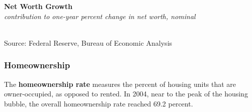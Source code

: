 \documentclass{report}
\makeatletter
\newcommand{\tbllink}[1]{\href{https://raw.githubusercontent.com/bdecon/US-chartbook/master/chartbook/data/#1}{\faTable}}
\newcommand*\short[1]{\expandafter\@gobbletwo\number\numexpr#1\relax}
\newcommand{\sbar}[4]{
		\addplot[ybar stacked, bar width=2.6pt, draw opacity=0, fill=#1] 
			table [x=#2, y=#3, col sep=comma]{#4};}
\newcommand{\dateaxisticks}{
		date coordinates in=x, axis line style={draw=none},
		xmax={2020-05-10},
		max space between ticks=40,	    
		xtick={{1990-01-01}, {1992-01-01}, {1994-01-01}, 
			{1996-01-01}, {1998-01-01}, {2000-01-01}, 
			{2002-01-01}, {2004-01-01}, {2006-01-01},
			{2008-01-01}, {2010-01-01}, {2012-01-01}, {2014-01-01},
		    {2016-01-01}, {2018-01-01}, {2020-01-01}},
		minor xtick={{1989-01-01}, {1991-01-01}, {1993-01-01},
			{1995-01-01}, {1997-01-01}, {1999-01-01}, 
			{2001-01-01}, {2003-01-01}, {2005-01-01}, {2007-01-01},
		    {2009-01-01}, {2011-01-01}, {2013-01-01}, {2015-01-01},
		    {2017-01-01}, {2019-01-01}},
		enlarge y limits={0.06}, enlarge x limits={0.01},
		}
\newcommand{\bbar}[2]{extra #1 ticks = {{#2}}, extra #1 tick labels = ,
		extra #1 tick style = {grid=major, grid style={thick, black!25}},}
\newcommand{\rbars}{
		\fill[color=black!10] (axis cs:{1990-07-01},\pgfkeysvalueof{/pgfplots/ymin}) rectangle 
			(axis cs:{1991-03-01}, \pgfkeysvalueof{/pgfplots/ymax});
		\fill[color=black!10] (axis cs:{2007-12-01},\pgfkeysvalueof{/pgfplots/ymin}) rectangle 
			(axis cs:{2009-07-01}, \pgfkeysvalueof{/pgfplots/ymax});
		\fill[color=black!10] (axis cs:{2001-03-01},\pgfkeysvalueof{/pgfplots/ymin}) rectangle 
			(axis cs:{2001-11-01}, \pgfkeysvalueof{/pgfplots/ymax});}
\makeatother
\begin{document}
{{{{\begin{minipage}{0.76\textwidth}
\vspace{2mm}

\noindent \normalsize \textbf{Net Worth Growth}\\
\footnotesize{\textit{contribution to one-year percent change in net worth, nominal}}\\
\noindent \hspace*{-3mm} \\
\footnotesize{Source: Federal Reserve, Bureau of Economic Analysis} \hfill \tbllink{nw_gr.csv}\\

\vspace{3mm}

\small 


\end{minipage}

\newpage

\begin{minipage}{0.76\textwidth}

\subsubsection*{\color{black!70} \seriffont Homeownership}

\small The \textbf{homeownership rate} measures the percent of housing units that are owner-occupied, as opposed to rented. In 2004, near to the peak of the housing bubble, the overall homeownership rate reached 69.2 percent. 

\end{minipage}

\vspace{1mm}

\begin{minipage}{0.405\textwidth}


\end{minipage}}}}}
\end{document}
